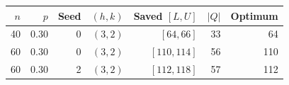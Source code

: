 \begin{tabular}{rrrrrrr}
\toprule
$n$ & $p$ & Seed & $(h,k)$ & Saved $[L,U]$ & $|Q|$ & Optimum\\
\midrule
40 & 0.30 & 0 & $(3,2)$ & $[64,66]$ & 33 & 64\\
60 & 0.30 & 0 & $(3,2)$ & $[110,114]$ & 56 & 110\\
60 & 0.30 & 2 & $(3,2)$ & $[112,118]$ & 57 & 112\\
\bottomrule
\end{tabular}
